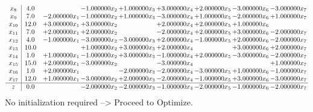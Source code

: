 \documentclass[10pt]{article}
\begin{document}
\[\begin{array}{c| c c@{\hskip 2pt} c@{\hskip 2pt} c@{\hskip 2pt} c@{\hskip 2pt} c@{\hskip 2pt} c@{\hskip 2pt} c@{\hskip 2pt} }
 x_{8}   &  4.0  &   & -1.000000 x_{2} & + 1.000000 x_{3} & + 3.000000 x_{4} & + 2.000000 x_{5} & -3.000000 x_{6} & -3.000000 x_{7}\\
 x_{9}   &  7.0 & -2.000000 x_{1} & -1.000000 x_{2} & + 1.000000 x_{3} & -3.000000 x_{4} & + 1.000000 x_{5} & -2.000000 x_{6} & + 1.000000 x_{7}\\
 x_{10}   &  12.0 & + 3.000000 x_{1} & + 3.000000 x_{2} &   & + 2.000000 x_{4} & + 2.000000 x_{5} & + 1.000000 x_{6} &   \\
 x_{11}   &  7.0 & + 2.000000 x_{1} & + 2.000000 x_{2} &   & -2.000000 x_{4} & + 2.000000 x_{5} & + 3.000000 x_{6} & -2.000000 x_{7}\\
 x_{12}   &  4.0 & -1.000000 x_{1} & -3.000000 x_{2} & -3.000000 x_{3} & + 2.000000 x_{4} & -1.000000 x_{5} & + 2.000000 x_{6} & -2.000000 x_{7}\\
 x_{13}   &  10.0  &   & + 1.000000 x_{2} & + 3.000000 x_{3} & + 2.000000 x_{4} &   & + 3.000000 x_{6} & + 2.000000 x_{7}\\
 x_{14}   &  1.0 & + 1.000000 x_{1} & -1.000000 x_{2} & + 3.000000 x_{3} & -1.000000 x_{4} & + 2.000000 x_{5} & -3.000000 x_{6} & -2.000000 x_{7}\\
 x_{15}   &  15.0 & + 2.000000 x_{1} & -3.000000 x_{2} &   & -3.000000 x_{4} &    &   & + 1.000000 x_{7}\\
 x_{16}   &  1.0 & + 2.000000 x_{1} &   & -2.000000 x_{3} & -2.000000 x_{4} & -3.000000 x_{5} & + 1.000000 x_{6} & -1.000000 x_{7}\\
 x_{17}   &  12.0 & + 1.000000 x_{1} & -3.000000 x_{2} & + 2.000000 x_{3} & -2.000000 x_{4} & -1.000000 x_{5} & + 3.000000 x_{6} & -3.000000 x_{7}\\
\hline
z    &  0.0  &   & -2.000000 x_{2} & -2.000000 x_{3} & -1.000000 x_{4} & -2.000000 x_{5} & -1.000000 x_{6} & -2.000000 x_{7}\\
\end{array}\]
No initialization required --> Proceed to Optimize. 
\end{document}

